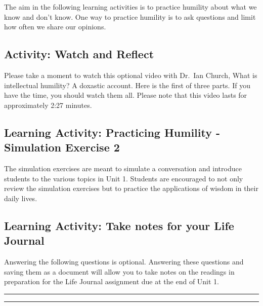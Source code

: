 \documentclass[
]{book}
\begin{document}
The aim in the following learning activities is to practice humility about what we know and don't know. One way to practice humility is to ask questions and limit how often we share our opinions.

\hypertarget{activity-watch-and-reflect-2}{%
\subsection*{Activity: Watch and Reflect}\label{activity-watch-and-reflect-2}}

\begin{reflect}
Please take a moment to watch this optional video with Dr.~Ian Church, What is intellectual humility? A doxastic account. Here is the first of three parts. If you have the time, you should watch them all. Please note that this video lasts for approximately 2:27 minutes.
\end{reflect}

\hypertarget{learning-activity-practicing-humility---simulation-exercise-2}{%
\subsection{Learning Activity: Practicing Humility - Simulation Exercise 2}\label{learning-activity-practicing-humility---simulation-exercise-2}}

The simulation exercises are meant to simulate a conversation and introduce students to the various topics in Unit 1. Students are encouraged to not only review the simulation exercises but to practice the applications of wisdom in their daily lives.

\hypertarget{learning-activity-take-notes-for-your-life-journal-2}{%
\subsection{Learning Activity: Take notes for your Life Journal}\label{learning-activity-take-notes-for-your-life-journal-2}}

Answering the following questions is optional. Answering these questions and saving them as a document will allow you to take notes on the readings in preparation for the Life Journal assignment due at the end of Unit 1.

\begin{center}\rule{0.5\linewidth}{0.5pt}\end{center}

\begin{center}\rule{0.5\linewidth}{0.5pt}\end{center}
\end{document}
